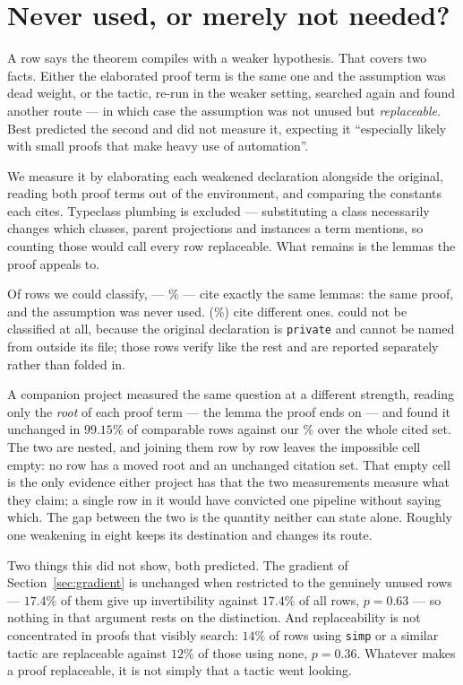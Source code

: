 \documentclass[11pt]{article}
\begin{document}
\section{Never used, or merely not needed?}\label{sec:unused}

A row says the theorem compiles with a weaker hypothesis. That covers two facts.
Either the elaborated proof term is the same one and the assumption was dead
weight, or the tactic, re-run in the weaker setting, searched again and found
another route --- in which case the assumption was not unused but
\emph{replaceable}. Best predicted the second and did not measure it, expecting
it ``especially likely with small proofs that make heavy use of automation''.

We measure it by elaborating each weakened declaration alongside the original,
reading both proof terms out of the environment, and comparing the constants
each cites. Typeclass plumbing is excluded --- substituting a class necessarily
changes which classes, parent projections and instances a term mentions, so
counting those would call every row replaceable. What remains is the lemmas the
proof appeals to.

Of \classifiedCount{} rows we could classify, \unusedCount{} ---
\unusedPercent{}\% --- cite exactly the same lemmas: the same proof, and the
assumption was never used. \replaceableCount{} (\replaceablePercent{}\%) cite
different ones. \unclassifiedCount{} could not be classified at all, because the
original declaration is \texttt{private} and cannot be named from outside its
file; those rows verify like the rest and are reported separately rather than
folded in.


A companion project measured the same question at a different strength, reading
only the \emph{root} of each proof term --- the lemma the proof ends on --- and
found it unchanged in $99.15\%$ of comparable rows against our
\unusedPercent{}\% over the whole cited set. The two are nested, and joining
them row by row leaves the impossible cell empty: no row has a moved root and an
unchanged citation set. That empty cell is the only evidence either project has
that the two measurements measure what they claim; a single row in it would have
convicted one pipeline without saying which. The gap between the two is the
quantity neither can state alone. Roughly one weakening in eight keeps its
destination and changes its route.

Two things this did not show, both predicted. The gradient of
Section~\ref{sec:gradient} is unchanged when restricted to the genuinely unused
rows --- $17.4\%$ of them give up invertibility against $17.4\%$ of all rows,
$p = 0.63$ --- so nothing in that argument rests on the distinction. And
replaceability is not concentrated in proofs that visibly search: $14\%$ of
rows using \texttt{simp} or a similar tactic are replaceable against $12\%$ of
those using none, $p = 0.36$. Whatever makes a proof replaceable, it is not
simply that a tactic went looking.
\end{document}
